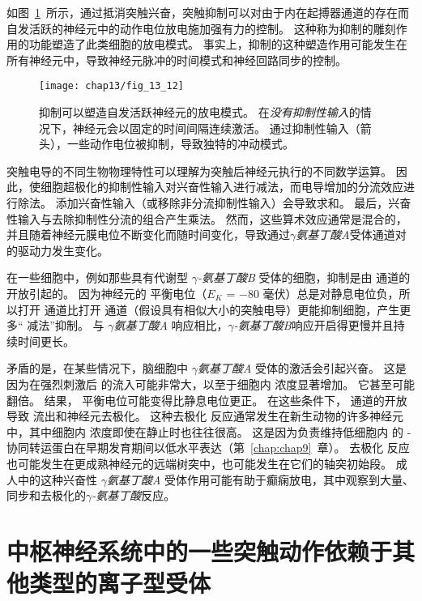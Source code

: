 如图~\ref{fig:13_12}~所示，通过抵消突触兴奋，突触抑制可以对由于内在起搏器通道的存在而自发活跃的神经元中的动作电位放电施加强有力的控制。
这种称为抑制的雕刻作用的功能塑造了此类细胞的放电模式。
事实上，抑制的这种塑造作用可能发生在所有神经元中，导致神经元脉冲的时间模式和神经回路同步的控制。


\begin{figure}[htbp]
	\centering
	\texttt{[image: chap13/fig\_13\_12]}
	\caption{抑制可以塑造自发活跃神经元的放电模式。
		在\textit{没有抑制性输入}的情况下，神经元会以固定的时间间隔连续激活。
		通过抑制性输入（箭头），一些动作电位被抑制，导致独特的冲动模式。}
	\label{fig:13_12}
\end{figure}


突触电导的不同生物物理特性可以理解为突触后神经元执行的不同数学运算。
因此，使细胞超极化的抑制性输入对兴奋性输入进行减法，而电导增加的分流效应进行除法。
添加兴奋性输入（或移除非分流抑制性输入）会导致求和。
最后，兴奋性输入与去除抑制性分流的组合产生乘法。
然而，这些算术效应通常是混合的，并且随着神经元膜电位不断变化而随时间变化，导致通过\textit{$\gamma$氨基丁酸A}受体通道对  的驱动力发生变化。


在一些细胞中，例如那些具有代谢型 \textit{$\gamma$-氨基丁酸B} 受体的细胞，抑制是由  通道的开放引起的。
因为神经元的  平衡电位（$E_K$ = −80 毫伏）总是对静息电位负，所以打开  通道比打开  通道（假设具有相似大小的突触电导）更能抑制细胞，产生更多“ 减法”抑制。
与 \textit{$\gamma$氨基丁酸A} 响应相比，\textit{$\gamma$-氨基丁酸B}响应开启得更慢并且持续时间更长。


矛盾的是，在某些情况下，脑细胞中 \textit{$\gamma$氨基丁酸A} 受体的激活会引起兴奋。
这是因为在强烈刺激后  的流入可能非常大，以至于细胞内  浓度显著增加。
它甚至可能翻倍。
结果， 平衡电位可能变得比静息电位更正。
在这些条件下， 通道的开放导致  流出和神经元去极化。
这种去极化  反应通常发生在新生动物的许多神经元中，其中细胞内  浓度即使在静止时也往往很高。
这是因为负责维持低细胞内  的 - 协同转运蛋白在早期发育期间以低水平表达（第~\ref{chap:chap9}~章）。
去极化  反应也可能发生在更成熟神经元的远端树突中，也可能发生在它们的轴突初始段。
成人中的这种兴奋性 \textit{$\gamma$氨基丁酸A} 受体作用可能有助于癫痫放电，其中观察到大量、同步和去极化的\textit{$\gamma$-氨基丁酸}反应。



\section{中枢神经系统中的一些突触动作依赖于其他类型的离子型受体}

